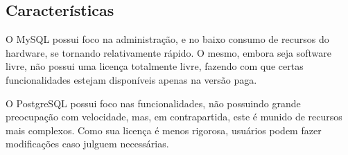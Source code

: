 \documentclass[12pt]{article}
\begin{document}
    \subsection{Características}
         O MySQL possui foco na administração, e no baixo consumo de recursos do hardware, se tornando relativamente rápido. O mesmo, embora seja software livre, não possui uma licença totalmente livre, fazendo com que certas funcionalidades estejam disponíveis apenas na versão paga.
         
         O PostgreSQL possui foco nas funcionalidades, não possuindo grande preocupação com velocidade, mas, em contrapartida, este é munido de recursos mais complexos. Como sua licença é menos rigorosa, usuários podem fazer modificações caso julguem necessárias.  

\nocite{ex1}


\end{document}
